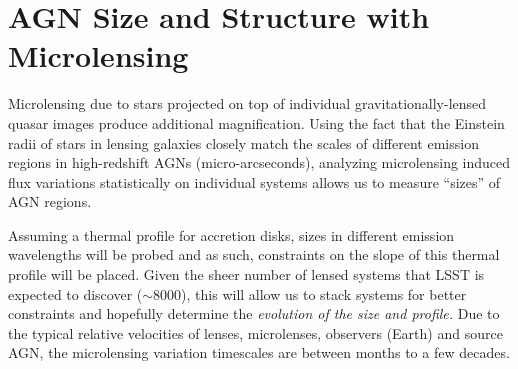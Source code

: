 %
%
%
%
%
%
%

\section{AGN Size and Structure with Microlensing}
\def\secname{\chpname:microlensing}\label{sec:\secname}




Microlensing due to stars projected on top of individual
gravitationally-lensed quasar images produce additional magnification.
Using the fact that the Einstein radii of stars in lensing galaxies
closely match the scales of different emission regions in
high-redshift AGNs (micro-arcseconds), analyzing microlensing induced
flux variations statistically on individual systems allows us to
measure ``sizes'' of AGN regions.

Assuming a thermal profile for accretion disks, sizes in different
emission wavelengths will be probed and as such, constraints on the
slope of this thermal profile will be placed. Given the sheer number
of lensed systems that LSST is expected to discover ($\sim8000$),
this will allow us to stack systems for better constraints and
hopefully determine the {\it evolution of the size and profile.} Due to the
typical relative velocities of lenses, microlenses, observers (Earth)
and source AGN, the microlensing variation timescales are between
months to a few decades.


